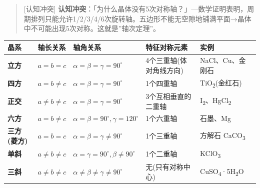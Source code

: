 \begin{quote}
{[}认知冲突{]} \textbf{认知冲突}：「为什么晶体没有5次对称轴？」---数学证明表明，周期排列只能允许1/2/3/4/6次旋转轴。五边形不能无空隙地铺满平面→晶体中不可能出现5次对称。这就是''轴次定理''。
\end{quote}

{\def\LTcaptype{none} %
\begin{longtable}[]{@{}
  >{\raggedright\arraybackslash}p{}
  >{\raggedright\arraybackslash}p{}
  >{\raggedright\arraybackslash}p{}
  >{\raggedright\arraybackslash}p{}
  >{\raggedright\arraybackslash}p{}@{}}
\toprule\noalign{}
\begin{minipage}[b]{\linewidth}\raggedright
晶系
\end{minipage} & \begin{minipage}[b]{\linewidth}\raggedright
轴长关系
\end{minipage} & \begin{minipage}[b]{\linewidth}\raggedright
轴角关系
\end{minipage} & \begin{minipage}[b]{\linewidth}\raggedright
特征对称元素
\end{minipage} & \begin{minipage}[b]{\linewidth}\raggedright
实例
\end{minipage} \\
\midrule\noalign{}
\endhead
\bottomrule\noalign{}
\endlastfoot
\textbf{立方} & \(a = b = c\) & \(\alpha = \beta = \gamma = 90^\circ\) & 4个三重轴(体对角线方向) & NaCl、Cu、金刚石 \\
\textbf{四方} & \(a = b \neq c\) & \(\alpha = \beta = \gamma = 90^\circ\) & 1个四重轴 & TiO\textsubscript{2}(金红石) \\
\textbf{正交} & \(a \neq b \neq c\) & \(\alpha = \beta = \gamma = 90^\circ\) & 3个互相垂直的二重轴 & I\textsubscript{2}、HgCl\textsubscript{2} \\
\textbf{六方} & \(a = b \neq c\) & \(\alpha = \beta = 90^\circ, \gamma = 120^\circ\) & 1个六重轴 & 石墨、Mg \\
\textbf{三方(菱方)} & \(a = b = c\) & \(\alpha = \beta = \gamma \neq 90^\circ\) & 1个三重轴 & 方解石 CaCO\textsubscript{3} \\
\textbf{单斜} & \(a \neq b \neq c\) & \(\alpha = \gamma = 90^\circ, \beta \neq 90^\circ\) & 1个二重轴 & KClO\textsubscript{3} \\
\textbf{三斜} & \(a \neq b \neq c\) & \(\alpha \neq \beta \neq \gamma \neq 90^\circ\) & 无(只有对称中心) & CuSO\textsubscript{4}·5H\textsubscript{2}O \\
\end{longtable}
}

